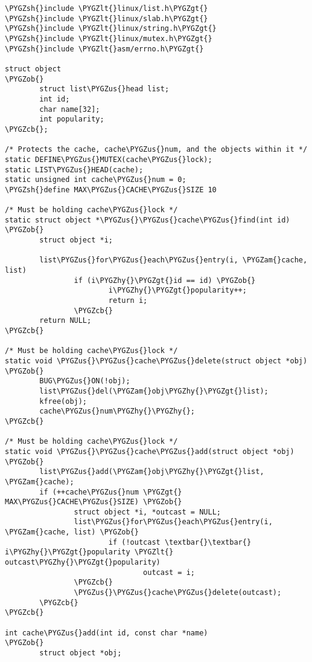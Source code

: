 \documentclass[a4paper,8pt,english]{sphinxmanual}
\def\PYGZus{\char`\_}
\def\PYGZob{\char`\{}
\def\PYGZcb{\char`\}}
\def\PYGZam{\char`\&}
\def\PYGZlt{\char`\<}
\def\PYGZgt{\char`\>}
\def\PYGZsh{\char`\#}
\def\PYGZhy{\char`\-}
\begin{document}
\begin{Verbatim}[commandchars=\\\{\}]
\PYGZsh{}include \PYGZlt{}linux/list.h\PYGZgt{}
\PYGZsh{}include \PYGZlt{}linux/slab.h\PYGZgt{}
\PYGZsh{}include \PYGZlt{}linux/string.h\PYGZgt{}
\PYGZsh{}include \PYGZlt{}linux/mutex.h\PYGZgt{}
\PYGZsh{}include \PYGZlt{}asm/errno.h\PYGZgt{}

struct object
\PYGZob{}
        struct list\PYGZus{}head list;
        int id;
        char name[32];
        int popularity;
\PYGZcb{};

/* Protects the cache, cache\PYGZus{}num, and the objects within it */
static DEFINE\PYGZus{}MUTEX(cache\PYGZus{}lock);
static LIST\PYGZus{}HEAD(cache);
static unsigned int cache\PYGZus{}num = 0;
\PYGZsh{}define MAX\PYGZus{}CACHE\PYGZus{}SIZE 10

/* Must be holding cache\PYGZus{}lock */
static struct object *\PYGZus{}\PYGZus{}cache\PYGZus{}find(int id)
\PYGZob{}
        struct object *i;

        list\PYGZus{}for\PYGZus{}each\PYGZus{}entry(i, \PYGZam{}cache, list)
                if (i\PYGZhy{}\PYGZgt{}id == id) \PYGZob{}
                        i\PYGZhy{}\PYGZgt{}popularity++;
                        return i;
                \PYGZcb{}
        return NULL;
\PYGZcb{}

/* Must be holding cache\PYGZus{}lock */
static void \PYGZus{}\PYGZus{}cache\PYGZus{}delete(struct object *obj)
\PYGZob{}
        BUG\PYGZus{}ON(!obj);
        list\PYGZus{}del(\PYGZam{}obj\PYGZhy{}\PYGZgt{}list);
        kfree(obj);
        cache\PYGZus{}num\PYGZhy{}\PYGZhy{};
\PYGZcb{}

/* Must be holding cache\PYGZus{}lock */
static void \PYGZus{}\PYGZus{}cache\PYGZus{}add(struct object *obj)
\PYGZob{}
        list\PYGZus{}add(\PYGZam{}obj\PYGZhy{}\PYGZgt{}list, \PYGZam{}cache);
        if (++cache\PYGZus{}num \PYGZgt{} MAX\PYGZus{}CACHE\PYGZus{}SIZE) \PYGZob{}
                struct object *i, *outcast = NULL;
                list\PYGZus{}for\PYGZus{}each\PYGZus{}entry(i, \PYGZam{}cache, list) \PYGZob{}
                        if (!outcast \textbar{}\textbar{} i\PYGZhy{}\PYGZgt{}popularity \PYGZlt{} outcast\PYGZhy{}\PYGZgt{}popularity)
                                outcast = i;
                \PYGZcb{}
                \PYGZus{}\PYGZus{}cache\PYGZus{}delete(outcast);
        \PYGZcb{}
\PYGZcb{}

int cache\PYGZus{}add(int id, const char *name)
\PYGZob{}
        struct object *obj;


\end{Verbatim}
\end{document}
